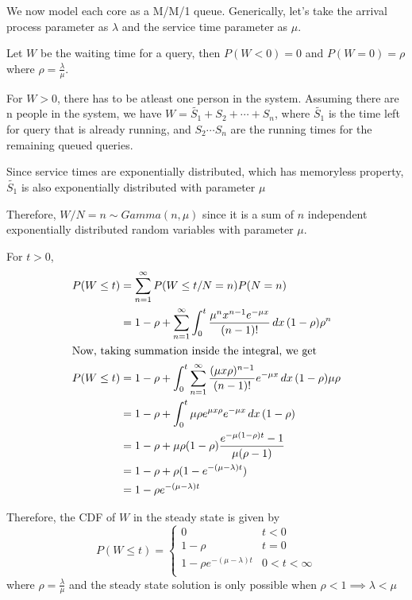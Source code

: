 \documentclass[12pt, oneside]{article}
\begin{document}
\begin{enumerate}
{    We now model each core as a M/M/1 queue. Generically, let's take the arrival process
    parameter as \(\lambda\) and the service time parameter as \(\mu\).

    Let \(W\) be the waiting time for a query, then \(P(W < 0) = 0\) and \(P(W = 0) = \rho\)
    where \(\rho = \frac{\lambda}{\mu}\).

    For \(W > 0\), there has to be atleast one person in the system. Assuming there are n
    people in the system, we have \(W = \widetilde{S_1} + S_2 + \cdots + S_n\), where 
    \(\widetilde{S_1}\) is the time left for query that is already running, and \(S_2 \cdots S_n\)
    are the running times for the remaining queued queries.

    Since service times are exponentially distributed, which has memoryless property,
    \(\widetilde{S_1}\) is also exponentially distributed with parameter \(\mu\)

    Therefore, \(W / N = n \sim Gamma(n, \mu)\)  since it is a sum of \(n\) independent
    exponentially distributed random variables with parameter \(\mu\).

    For \(t > 0\),
    \begin{align*}
        P(W \leq t) &= \sum_{n=1}^{\infty} P(W \leq t / N = n) P(N = n) \\
                    &= 1 - \rho + \sum_{n=1}^{\infty} \int_0^{t} \frac{\mu^n x^{n-1}e^{-\mu x}}{(n - 1)!}\,dx\,
                        (1 - \rho) \rho^n \\
        \intertext{Now, taking summation inside the integral, we get}
        P(W \leq t) &= 1 - \rho + \int_0^t \sum_{n=1}^{\infty} \frac{(\mu x \rho)^{n-1}}{(n - 1)!} e^{-\mu x}\,dx\,(1-\rho)\mu\rho \\
                    &= 1 - \rho + \int_0^t \mu \rho e^{\mu x \rho} e^{-\mu x} \,dx\, (1 -\rho) \\
                    &= 1 - \rho + \mu \rho (1 - \rho) \frac{e^{-\mu(1-\rho)t} - 1}{\mu(\rho - 1)} \\
                    &= 1 - \rho + \rho (1 - e^{-(\mu - \lambda)t}) \\
                    &= 1 - \rho e^{-(\mu - \lambda)t}
    \end{align*}

    Therefore, the CDF of \(W\) in the steady state is given by
    \[
        P(W \leq t) = \begin{cases}
                        0 & t < 0 \\
                        1 - \rho & t = 0 \\
                        1 - \rho e^{-(\mu - \lambda)t} & 0 < t < \infty \\
                      \end{cases}
    \]
    where \(\rho = \frac{\lambda}{\mu}\) and the steady state solution is only possible
    when \(\rho < 1 \implies \lambda < \mu\)

}
\end{enumerate}
\end{document}
